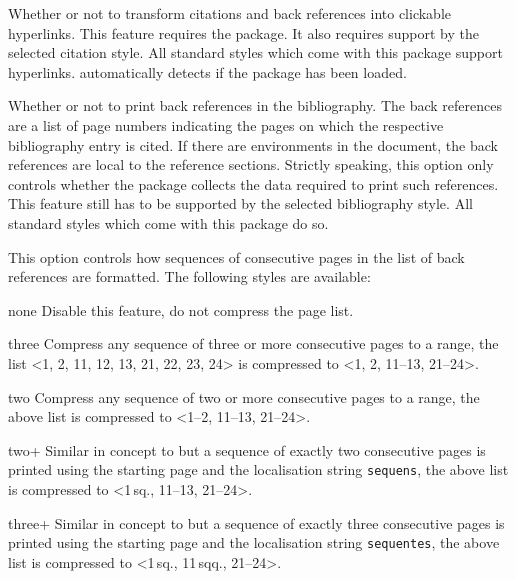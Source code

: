 \documentclass{ltxdockit}[2011/03/25]
\newcommand*{\biblatex}{\sty{biblatex}\xspace}
\begin{document}
\begin{optionlist}

Whether or not to transform citations and back references into clickable hyperlinks. This feature requires the  package. It also requires support by the selected citation style. All standard styles which come with this package support hyperlinks.  automatically detects if the  package has been loaded.


Whether or not to print back references in the bibliography. The back references are a list of page numbers indicating the pages on which the respective bibliography entry is cited. If there are  environments in the document, the back references are local to the reference sections. Strictly speaking, this option only controls whether the \biblatex package collects the data required to print such references. This feature still has to be supported by the selected bibliography style. All standard styles which come with this package do so.


This option controls how sequences of consecutive pages in the list of back references are formatted. The following styles are available:

\begin{valuelist}

\item[none] Disable this feature, \ie do not compress the page list.

\item[three] Compress any sequence of three or more consecutive pages to a range, \eg the list <1, 2, 11, 12, 13, 21, 22, 23, 24> is compressed to <1, 2, 11--13, 21--24>.

\item[two] Compress any sequence of two or more consecutive pages to a range, \eg the above list is compressed to <1--2, 11--13, 21--24>.

\item[two+] Similar in concept to  but a sequence of exactly two consecutive pages is printed using the starting page and the localisation string \texttt{sequens}, \eg the above list is compressed to <1\,sq., 11--13, 21--24>.

\item[three+] Similar in concept to  but a sequence of exactly three consecutive pages is printed using the starting page and the localisation string \texttt{sequentes}, \eg the above list is compressed to <1\,sq., 11\,sqq., 21--24>.


\end{valuelist}
\end{optionlist}
\end{document}
